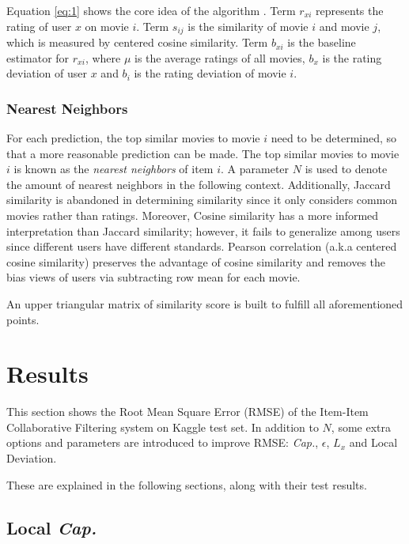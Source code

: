 \documentclass{ece}
\begin{document}
Equation \eqref{eq:1} shows the core idea of the algorithm \cite{mmds_org}.
Term $r_{xi}$ represents the rating of user $x$ on movie $i$.
Term $s_{ij}$ is the similarity of movie $i$ and movie $j$, which is measured by centered cosine similarity.
Term $b_{xi}$ is the baseline estimator for $r_{xi}$, where $\mu$ is the average ratings of all movies, $b_x$ is the rating deviation of user $x$ and $b_i$ is the rating deviation of movie $i$.

\subsubsection{Nearest Neighbors}
\label{knn}
For each prediction, the top similar movies to movie $i$ need to be determined, so that a more reasonable prediction can be made.
The top similar movies to movie $i$ is known as the \textit{nearest neighbors} of item $i$.
A parameter $N$ is used to denote the amount of nearest neighbors in the following context.
Additionally, Jaccard similarity is abandoned in determining similarity since it only considers common movies rather than ratings.
Moreover, Cosine similarity has a more informed interpretation than Jaccard similarity; however, it fails to generalize among users since different users have different standards.
Pearson correlation (a.k.a centered cosine similarity) preserves the advantage of cosine similarity and removes the bias views of users via subtracting row mean for each movie.

An upper triangular matrix of similarity score is built to fulfill all aforementioned points.

\section{Results}

This section shows the Root Mean Square Error (RMSE) of the Item-Item Collaborative Filtering system on Kaggle test set.
In addition to $N$, some extra options and parameters are introduced to improve RMSE:
\textit{Cap.},
$\epsilon$,
$L_x$ and Local Deviation.

These are explained in the following sections, along with their test results.

\subsection{Local \textit{Cap.}}
\end{document}
